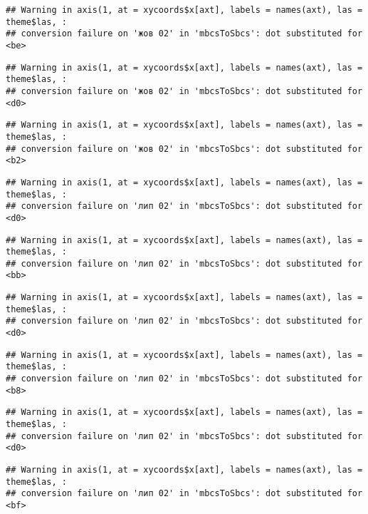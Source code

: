 \documentclass[]{article}
\begin{document}
\begin{verbatim}
## Warning in axis(1, at = xycoords$x[axt], labels = names(axt), las = theme$las, :
## conversion failure on 'жов 02' in 'mbcsToSbcs': dot substituted for <be>
\end{verbatim}

\begin{verbatim}
## Warning in axis(1, at = xycoords$x[axt], labels = names(axt), las = theme$las, :
## conversion failure on 'жов 02' in 'mbcsToSbcs': dot substituted for <d0>
\end{verbatim}

\begin{verbatim}
## Warning in axis(1, at = xycoords$x[axt], labels = names(axt), las = theme$las, :
## conversion failure on 'жов 02' in 'mbcsToSbcs': dot substituted for <b2>
\end{verbatim}

\begin{verbatim}
## Warning in axis(1, at = xycoords$x[axt], labels = names(axt), las = theme$las, :
## conversion failure on 'лип 02' in 'mbcsToSbcs': dot substituted for <d0>
\end{verbatim}

\begin{verbatim}
## Warning in axis(1, at = xycoords$x[axt], labels = names(axt), las = theme$las, :
## conversion failure on 'лип 02' in 'mbcsToSbcs': dot substituted for <bb>
\end{verbatim}

\begin{verbatim}
## Warning in axis(1, at = xycoords$x[axt], labels = names(axt), las = theme$las, :
## conversion failure on 'лип 02' in 'mbcsToSbcs': dot substituted for <d0>
\end{verbatim}

\begin{verbatim}
## Warning in axis(1, at = xycoords$x[axt], labels = names(axt), las = theme$las, :
## conversion failure on 'лип 02' in 'mbcsToSbcs': dot substituted for <b8>
\end{verbatim}

\begin{verbatim}
## Warning in axis(1, at = xycoords$x[axt], labels = names(axt), las = theme$las, :
## conversion failure on 'лип 02' in 'mbcsToSbcs': dot substituted for <d0>
\end{verbatim}

\begin{verbatim}
## Warning in axis(1, at = xycoords$x[axt], labels = names(axt), las = theme$las, :
## conversion failure on 'лип 02' in 'mbcsToSbcs': dot substituted for <bf>
\end{verbatim}
\end{document}
